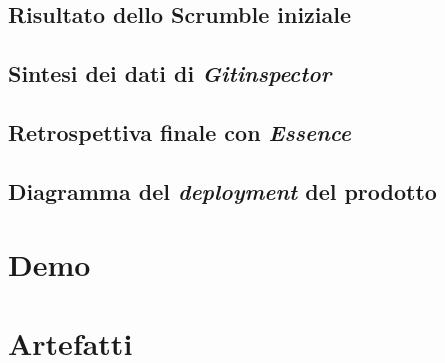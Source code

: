 \documentclass{article}
\begin{document}
\subsection{Risultato dello Scrumble iniziale}

\subsection{Sintesi dei dati di \emph{Gitinspector}}

\subsection{Retrospettiva finale con \emph{Essence}}

\subsection{Diagramma del \emph{deployment} del prodotto}

\section{Demo}

\section{Artefatti}
\end{document}
